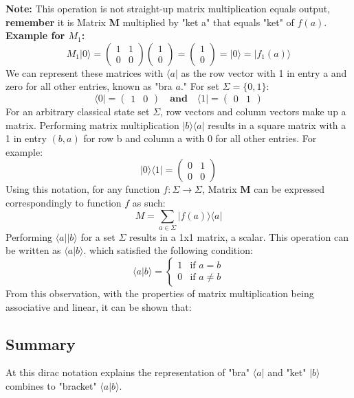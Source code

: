 \documentclass[11pt]{scrartcl}
\begin{document}
\textbf{Note:} This operation is not straight-up matrix multiplication equals output, \textbf{remember} it is Matrix \textbf{M}
multiplied by "ket a" that equals "ket" of $f(a)$.\vspace{2mm}
\newline
\textbf{Example for $M_1$:}
$$M_1 \vert 0 \rangle = \begin{pmatrix}
	1 & 1 \\
	0 & 0 \end{pmatrix}\begin{pmatrix}
	1 \\ 0\end{pmatrix} = \begin{pmatrix} 1 \\ 0\end{pmatrix} = \vert 0 \rangle = \vert f_1(a) \rangle$$
We can represent these matrices with $\langle a \vert$ as the row vector with 1
in entry a and zero for all other entries, known as "bra $a$." For set $\Sigma = \{0, 1\}$:
$$\langle 0 \vert = \begin{pmatrix} 1 & 0 \end{pmatrix} \quad \textbf{and} \quad \langle 1 \vert = \begin{pmatrix} 0 & 1 \end{pmatrix}$$
For an arbitrary classical state set $\Sigma$, row vectors and column vectors make up a matrix. Performing
matrix multiplication $\vert b \rangle \langle a \vert$ results in a square matrix with a  1 in entry $(b, a)$
for row b and column a with 0 for all other entries. For example:
$$\vert 0 \rangle \langle 1 \vert = \begin{pmatrix} 0 & 1 \\ 0 & 0 \end{pmatrix}$$
Using this notation, for any function $f : \Sigma \rightarrow \Sigma$, Matrix \textbf{M} can be expressed correspondingly to function $f$ as such:
\[M =  \sum_{a\in \Sigma} \vert f(a) \rangle \langle a \vert\]
Performing $\langle a \vert \vert b \rangle$ for a set $\Sigma$ results in a 1x1 matrix, a scalar. This operation can be written as $\langle a \vert b \rangle$.
which satisfied the following condition:
\[
\langle a | b \rangle =
  \begin{cases} 
    1 & \text{if } a = b \\
    0 & \text{if } a \neq b
  \end{cases}
\]
From this observation, with the properties of matrix multiplication being associative and linear, it can be shown that:
\subsection{Summary}
At this dirac notation explains the representation of "bra" $\langle a \vert$ and "ket" $\vert b \rangle$ combines to "bracket" $\langle a \vert b \rangle$.
\end{document}
